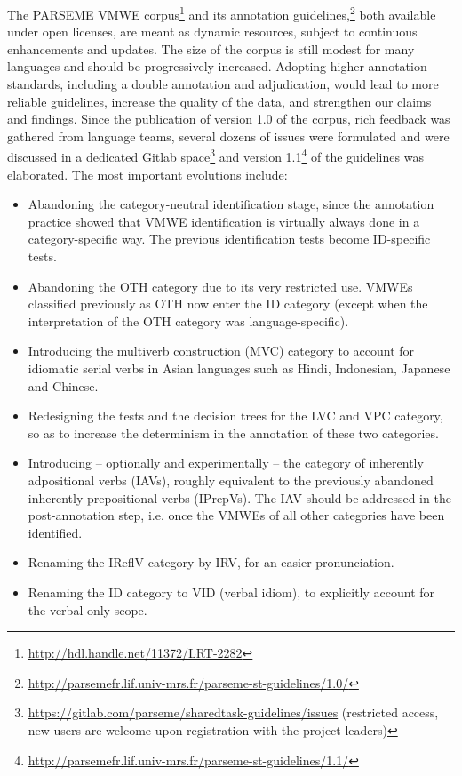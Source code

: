 \documentclass[output=paper,modfonts]{langscibook}
\begin{document}
%
The PARSEME VMWE corpus\footnote{\url{http://hdl.handle.net/11372/LRT-2282}} and its annotation guidelines,\footnote{\url{http://parsemefr.lif.univ-mrs.fr/parseme-st-guidelines/1.0/}} both available under open licenses, are meant as dynamic resources, subject to continuous enhancements and updates. 
The size of the corpus is still modest for many languages and should be progressively increased. Adopting higher annotation standards, including a double annotation and adjudication, would lead to more reliable guidelines, increase the quality of the data, and strengthen our claims and findings. Since the publication of version 1.0 of the corpus, rich feedback was gathered from language teams, several dozens of issues were formulated and were discussed in a dedicated Gitlab space\footnote{\url{https://gitlab.com/parseme/sharedtask-guidelines/issues} (restricted access, new users are welcome upon registration with the project leaders)} and version 1.1\footnote{\url{http://parsemefr.lif.univ-mrs.fr/parseme-st-guidelines/1.1/}} of the guidelines was elaborated. The most important evolutions include:
\begin{itemize}
\item Abandoning the category-neutral identification stage, since the annotation practice showed that VMWE identification is virtually always done in a category-specific way. The previous identification tests become ID-specific tests.
\item Abandoning the OTH category due to its very restricted use. VMWEs classified previously as OTH now enter the ID category (except when the interpretation of the OTH category was language-specific).
\item Introducing the multiverb construction (MVC) category to account for idiomatic serial verbs in Asian languages such as Hindi, Indonesian, Japanese and Chinese.
\item Redesigning the tests and the decision trees for the LVC and VPC category, so as to increase the determinism in the annotation of these two categories.
\item Introducing -- optionally and experimentally -- the category of inherently adpositional verbs (IAVs), roughly equivalent to the previously abandoned inherently prepositional verbs (IPrepVs).  The IAV should be addressed in the post-annotation step, i.e. once the VMWEs of all other categories have been identified.
\item Renaming the IReflV category by IRV, for an easier pronunciation.
\item Renaming the ID category to VID (verbal idiom), to explicitly account for the verbal-only scope.
\end{itemize}
\end{document}
